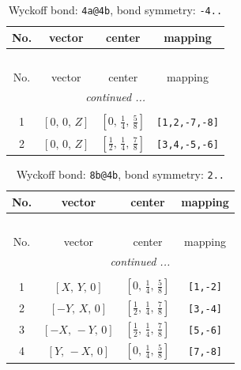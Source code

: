\documentclass[fleqn,8pt]{jsarticle}
\begin{document}
\begin{longtable}{cccc}
\caption{Wyckoff bond: {\tt 4a@4b}, bond symmetry: {\tt -4..}}
 \\
 \hline \hline
No. & vector & center & mapping \\ \hline \endfirsthead

\multicolumn{3}{l}{\tablename\ \thetable{}} \\
 \hline \hline
No. & vector & center & mapping \\ \hline \endhead

 \hline \hline
\multicolumn{3}{r}{\footnotesize\it continued ...} \\ \endfoot

 \hline \hline
\multicolumn{3}{r}{} \\ \endlastfoot

1 & $\left[ 0,\, 0,\, Z \right]$ & $\left[ 0,\, \frac{1}{4},\, \frac{5}{8} \right]$ & {\tt [1,2,-7,-8]} \\ \hline
2 & $\left[ 0,\, 0,\, Z \right]$ & $\left[ \frac{1}{2},\, \frac{1}{4},\, \frac{7}{8} \right]$ & {\tt [3,4,-5,-6]} \\
\end{longtable}
\renewcommand{\arraystretch}{1.2}
\begin{longtable}{cccc}
\caption{Wyckoff bond: {\tt 8b@4b}, bond symmetry: {\tt 2..}}
 \\
 \hline \hline
No. & vector & center & mapping \\ \hline \endfirsthead

\multicolumn{3}{l}{\tablename\ \thetable{}} \\
 \hline \hline
No. & vector & center & mapping \\ \hline \endhead

 \hline \hline
\multicolumn{3}{r}{\footnotesize\it continued ...} \\ \endfoot

 \hline \hline
\multicolumn{3}{r}{} \\ \endlastfoot

1 & $\left[ X,\, Y,\, 0 \right]$ & $\left[ 0,\, \frac{1}{4},\, \frac{5}{8} \right]$ & {\tt [1,-2]} \\ \hline
2 & $\left[ - Y,\, X,\, 0 \right]$ & $\left[ \frac{1}{2},\, \frac{1}{4},\, \frac{7}{8} \right]$ & {\tt [3,-4]} \\ \hline
3 & $\left[ - X,\, - Y,\, 0 \right]$ & $\left[ \frac{1}{2},\, \frac{1}{4},\, \frac{7}{8} \right]$ & {\tt [5,-6]} \\ \hline
4 & $\left[ Y,\, - X,\, 0 \right]$ & $\left[ 0,\, \frac{1}{4},\, \frac{5}{8} \right]$ & {\tt [7,-8]} \\
\end{longtable}
\end{document}
